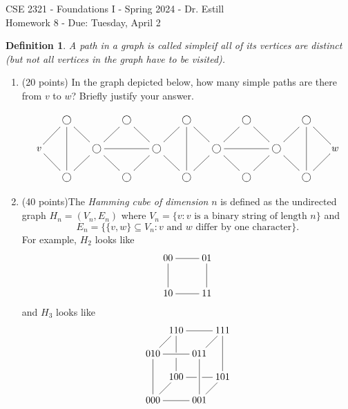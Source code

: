 \documentclass[12 pt]{amsart}
\newcommand{\sse}{\subseteq}
\newtheorem{df}[thm]{Definition}
\begin{document}
\begin{center} \Large
	CSE 2321 - Foundations I - Spring 2024 - Dr. Estill \\ \large
	Homework 8 - Due: Tuesday, April 2	\\
\end{center}

\vspace{2ex}

	\begin{df}
		A path in a graph is called \emph{simple}\label{simple} if all of its vertices are distinct (but not all vertices in the graph have to be visited).
	\end{df}

\begin{enumerate}[label=\arabic*.)]
	
	\item (20 points) In the graph depicted below, how many simple paths are there from $v$ to $w$?
	Briefly justify your answer.
	
	\[\xymatrix@=15pt{
		& \bigcirc\ar@{-}[dd]\ar@{-}[rd]	& & \bigcirc\ar@{-}[rd]	& & \bigcirc\ar@{-}[dd]\ar@{-}[rd]	& & \bigcirc\ar@{-}[rd]	& & \bigcirc\ar@{-}[dd]\ar@{-}[rd] \\
	v\ar@{-}[ur]\ar@{-}[dr]	& & \bigcirc\ar@{-}[ur]\ar@{-}[rr]\ar@{-}[dr]	& & \bigcirc\ar@{-}[ur]\ar@{-}[dr]	& & \bigcirc\ar@{-}[ur]\ar@{-}[rr]\ar@{-}[dr]	& & \bigcirc\ar@{-}[ur]\ar@{-}[dr]	& & w \\
		& \bigcirc\ar@{-}[ur]			& & \bigcirc\ar@{-}[ur]	& & \bigcirc\ar@{-}[ur]	& & \bigcirc\ar@{-}[ur]	& & \bigcirc\ar@{-}[ur]
	}\]
	
	\vspace{1 cm}

	
	\item (40 points)The \emph{Hamming cube of dimension} $n$ is defined as the undirected graph $H_n = (V_n, E_n)$ where $V_n = \{ v : v \text{ is a binary string of length } n\}$ and $$E_n = \big\{ \{v, w \} \sse V_n : v \text{ and } w \text{ differ by one character}\big\}.$$
		For example, $H_2$ looks like
		\[\xymatrix{
			00 \ar@{-}[r]\ar@{-}[d]	& 01 \ar@{-}[d] \\
			10 \ar@{-}[r]			& 11
		}\]
		and $H_3$ looks like
		\[\xymatrix@!0{
			& 110 \ar@{-}[rr]\ar@{-}'[d][dd] & & 111 \ar@{-}[dd] \\
			010 \ar@{-}[ur]\ar@{-}[rr]\ar@{-}[dd] & & 011 \ar@{-}[ur]\ar@{-}[dd] \\
			& 100 \ar@{-}'[r][rr] & & 101 \\
			000 \ar@{-}[rr]\ar@{-}[ur] & & 001 \ar@{-}[ur]
		}\]
				

\end{enumerate}
\end{document}
